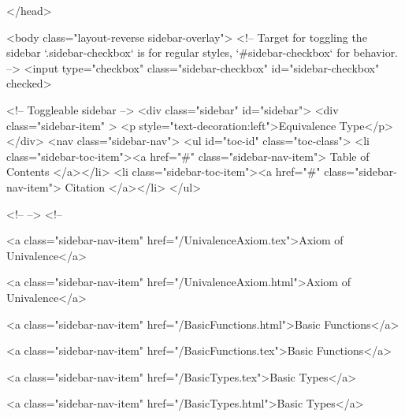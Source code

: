   
</head>




  <body class="layout-reverse sidebar-overlay">
    <!-- Target for toggling the sidebar `.sidebar-checkbox` is for regular
     styles, `#sidebar-checkbox` for behavior. -->
<input type="checkbox" class="sidebar-checkbox" id="sidebar-checkbox" checked>

<!-- Toggleable sidebar -->
<div class="sidebar" id="sidebar">
  <div class="sidebar-item" >
    <p style="text-decoration:left">Equivalence Type</p>
  </div>
  <nav class="sidebar-nav">
    <ul id="toc-id" class="toc-class">
  <li class="sidebar-toc-item"><a href="#" class="sidebar-nav-item"> Table of Contents </a></li>
  <li class="sidebar-toc-item"><a href="#" class="sidebar-nav-item"> Citation </a></li>
</ul>


    <!--  -->
    <!-- 
      
    
      
    
      
    
      
    
      
        
      
    
      
        
          <a class="sidebar-nav-item" href="/UnivalenceAxiom.tex">Axiom of Univalence</a>
        
      
    
      
        
          <a class="sidebar-nav-item" href="/UnivalenceAxiom.html">Axiom of Univalence</a>
        
      
    
      
        
          <a class="sidebar-nav-item" href="/BasicFunctions.html">Basic Functions</a>
        
      
    
      
        
          <a class="sidebar-nav-item" href="/BasicFunctions.tex">Basic Functions</a>
        
      
    
      
        
          <a class="sidebar-nav-item" href="/BasicTypes.tex">Basic Types</a>
        
      
    
      
        
          <a class="sidebar-nav-item" href="/BasicTypes.html">Basic Types</a>
        
      
    
